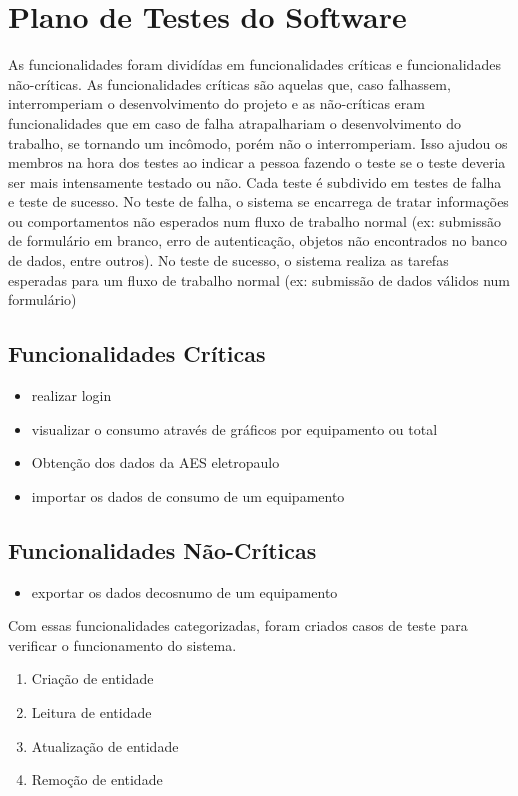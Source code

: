 \section{Plano de Testes do Software}
\label{Sec:6-software}

As funcionalidades foram dividídas em funcionalidades críticas e funcionalidades não-críticas. As funcionalidades críticas são aquelas que, caso falhassem, interromperiam o desenvolvimento do projeto e as não-críticas eram funcionalidades que em caso de falha atrapalhariam o desenvolvimento do trabalho, se tornando um incômodo, porém não o interromperiam. Isso ajudou os membros na hora dos testes ao indicar a pessoa fazendo o teste se o teste deveria ser mais intensamente testado ou não. Cada teste é subdivido em testes de falha e teste de sucesso. No teste de falha, o sistema se encarrega de tratar informações ou comportamentos não esperados num fluxo de trabalho normal (ex: submissão de formulário em branco, erro de autenticação, objetos não encontrados no banco de dados, entre outros). No teste de sucesso, o sistema realiza as tarefas esperadas para um fluxo de trabalho normal (ex: submissão de dados válidos num formulário)

\subsection{Funcionalidades Críticas}
\begin{itemize}
\item{realizar login}
\item{visualizar o consumo através de gráficos por equipamento ou total}
\item{Obtenção dos dados da AES eletropaulo}
\item{importar os dados de consumo de um equipamento}
\end{itemize}

\subsection{Funcionalidades Não-Críticas}
\begin{itemize}
\item{exportar os dados decosnumo de um equipamento}
\end{itemize}

Com essas funcionalidades categorizadas, foram criados casos de teste para verificar o funcionamento do sistema.

\begin{enumerate}
\item{
  Criação de entidade
}
\item{Leitura de entidade}
\item{Atualização de entidade}
\item{Remoção de entidade}

\end{enumerate}

